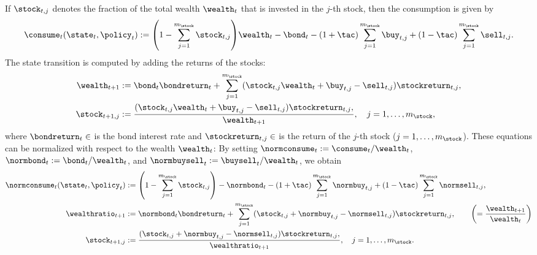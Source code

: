 If $\stock_{t,j}$ denotes the fraction of the total wealth $\wealth_t$
that is invested in the $j$-th stock,
then the consumption is given by
\begin{equation}
  \consume_t(\state_t, \policy_t)
  := \paren*{1 - \sum_{j=1}^{m_{\stock}} \stock_{t,j}} \wealth_t - \bond_t -
  (1 + \tac) \sum_{j=1}^{m_{\stock}} \buy_{t,j} +
  (1 - \tac) \sum_{j=1}^{m_{\stock}} \sell_{t,j}.
\end{equation}
The state transition is computed by adding the returns of the stocks:
\begin{subequations}
  \begin{align}
    \wealth_{t+1}
    &:= \bond_t \bondreturn_t + \sum_{j=1}^{m_{\stock}}
    (\stock_{t,j} \wealth_t + \buy_{t,j} - \sell_{t,j}) \stockreturn_{t,j},\\
    \stock_{t+1,j}
    &:= \frac{
      (\stock_{t,j} \wealth_t + \buy_{t,j} - \sell_{t,j}) \stockreturn_{t,j},
    }{\wealth_{t+1}},\quad
    j = 1, \dotsc, m_{\stock},
  \end{align}
\end{subequations}
where $\bondreturn_t \in \real$ is the bond interest rate and
$\stockreturn_{t,j} \in \real$ is the return of the $j$-th stock
($j = 1, \dotsc, m_{\stock}$).
These equations can be normalized with respect to the wealth $\wealth_t$:
By setting
$\normconsume_t := \consume_t/\wealth_t$,
$\normbond_t    := \bond_t   /\wealth_t$, and
$\normbuysell_t := \buysell_t/\wealth_t$, we obtain
\begin{subequations}
  \begin{align}
    \normconsume_t(\state_t, \policy_t)
    &:= \paren*{1 - \sum_{j=1}^{m_{\stock}} \stock_{t,j}} - \normbond_t -
    (1 + \tac) \sum_{j=1}^{m_{\stock}} \normbuy_{t,j} +
    (1 - \tac) \sum_{j=1}^{m_{\stock}} \normsell_{t,j},\\
    \wealthratio_{t+1}
    &:= \normbond_t \bondreturn_t + \sum_{j=1}^{m_{\stock}}
    (\stock_{t,j} + \normbuy_{t,j} - \normsell_{t,j}) \stockreturn_{t,j},
    \qquad\left(= \frac{\wealth_{t+1}}{\wealth_t}\right)\\
    \stock_{t+1,j}
    &:= \frac{
      (\stock_{t,j} + \normbuy_{t,j} - \normsell_{t,j}) \stockreturn_{t,j},
    }{\wealthratio_{t+1}},\quad
    j = 1, \dotsc, m_{\stock}.
  \end{align}
\end{subequations}
